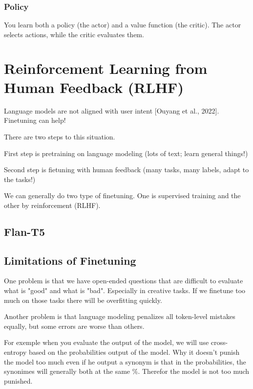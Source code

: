 \documentclass{article}
\begin{document}
\subsubsection{Policy} You learn both a policy (the actor) and a value function (the critic). The actor selects actions, while the critic evaluates them.

\clearpage\newpage

\section{Reinforcement Learning from Human Feedback (RLHF)}

Language models are not aligned with user intent [Ouyang et al., 2022]. Finetuning can help!

There are two steps to this situation.

First step is pretraining on language modeling (lots of text; learn general things!)

Second step is fietuning with human feedback (many tasks, many labels, adapt to the tasks!)

We can generally do two type of finetuning. One is supervised training and the other by reinforcement (RLHF).

\subsection{Flan-T5}

\subsection{Limitations of Finetuning}

One problem is that we have open-ended questions that are difficult to evaluate what is "good" and what is "bad". Especially in creative tasks. If we finetune too much on those tasks there will be overfitting quickly.

Another problem is that language modeling penalizes all token-level mistakes equally, but some errors are worse than others.

For exemple when you evaluate the output of the model, we will use cross-entropy based on the probabilities output of the model. Why it doesn't punish the model too much even if he output a synonym is that in the probabilities, the synonimes will generally both at the same \%. Therefor the model is not too much punished.
\end{document}
